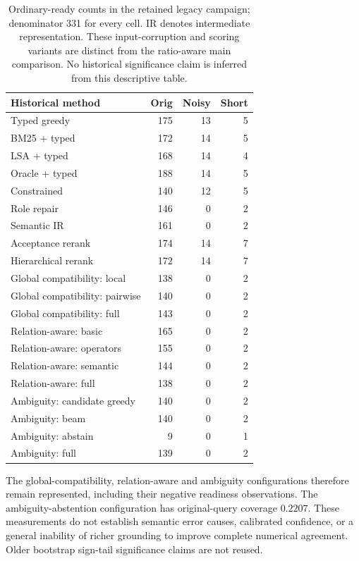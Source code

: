 \begin{table}[htbp]\centering\small
\caption{Ordinary-ready counts in the retained legacy campaign; denominator 331 for every cell. IR denotes intermediate representation. These input-corruption and scoring variants are distinct from the ratio-aware main comparison. No historical significance claim is inferred from this descriptive table.}\label{tab:legacy-grounding}
\begin{tabular}{@{}lrrr@{}}\toprule
Historical method & Orig & Noisy & Short\\\midrule
Typed greedy & 175 & 13 & 5\\
BM25 + typed & 172 & 14 & 5\\
LSA + typed & 168 & 14 & 4\\
Oracle + typed & 188 & 14 & 5\\
Constrained & 140 & 12 & 5\\
Role repair & 146 & 0 & 2\\
Semantic IR & 161 & 0 & 2\\
Acceptance rerank & 174 & 14 & 7\\
Hierarchical rerank & 172 & 14 & 7\\
Global compatibility: local & 138 & 0 & 2\\
Global compatibility: pairwise & 140 & 0 & 2\\
Global compatibility: full & 143 & 0 & 2\\
Relation-aware: basic & 165 & 0 & 2\\
Relation-aware: operators & 155 & 0 & 2\\
Relation-aware: semantic & 144 & 0 & 2\\
Relation-aware: full & 138 & 0 & 2\\
Ambiguity: candidate greedy & 140 & 0 & 2\\
Ambiguity: beam & 140 & 0 & 2\\
Ambiguity: abstain & 9 & 0 & 1\\
Ambiguity: full & 139 & 0 & 2\\
\bottomrule\end{tabular}\end{table}
The global-compatibility, relation-aware and ambiguity configurations therefore remain represented, including their negative readiness observations. The ambiguity-abstention configuration has original-query coverage $0.2207$. These measurements do not establish semantic error causes, calibrated confidence, or a general inability of richer grounding to improve complete numerical agreement. Older bootstrap sign-tail significance claims are not reused.

